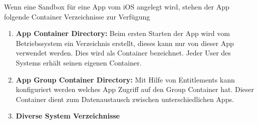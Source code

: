 Wenn eine Sandbox für eine App vom iOS angelegt wird, stehen der App folgende Container Verzeichnisse zur Verfügung
\begin{enumerate}
    \item \textbf{ App Container Directory:} Beim ersten Starten der App wird vom Betriebssystem ein Verzeichnis erstellt, dieses kann nur von dieser App verwendet werden. Dies wird als Container bezeichnet. Jeder User des Systems erhält seinen eigenen Container.
    \item \textbf{ App Group Container Directory:} Mit Hilfe von Entitlements kann konfiguriert werden welches App Zugriff auf den Group Container hat. Dieser Container dient zum Datenaustausch zwischen unterschiedlichen Apps.
    \item \textbf{Diverse System Verzeichnisse}
\end{enumerate}









